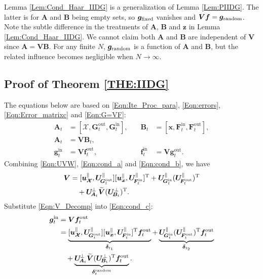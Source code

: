 \documentclass[journal]{IEEEtran}
\newcommand{\mr}{\mathrm}
\newcommand{\BS}{\begin{subequations}}
\newcommand{\ES}{\end{subequations}}
\renewcommand{\bf}{\bm}
\begin{document}
Lemma \ref{Lem:Cond_Haar_IIDG} is a generalization of Lemma \ref{Lem:PIIDG}. The latter is for $\bf{A}$ and $\bf{B}$ being empty sets, so $\bf{g}_{\rm fixed}$ vanishes and $\bf{Vf}=\bf{g}_{\rm random}$.  Note the subtle difference in the treatments of  $\bf{A}$, $\bf{B}$ and $\bf{z}$ in Lemma \ref{Lem:Cond_Haar_IIDG}. We cannot claim both $\bf{A}$ and $\bf{B}$ are independent of $\bf{V}$ since $\bf{A}=\bf{VB}$. For any finite $N$, $\bf{g}_{\rm random}$ is a function of $\bf{A}$ and $\bf{B}$, but the related influence becomes negligible when $N\to\infty$.   \vspace{-3mm}

\subsection{Proof of Theorem \ref{THE:IIDG}}\label{APP:IIDG_subsec}
The equations below are based on \eqref{Eqn:Ite_Proc_para}, \eqref{Eqn:errors}, \eqref{Eqn:Error_matrixc} and   \eqref{Eqn:G=VF}:\vspace{-0.4cm}
\BS\label{Eqn:conds}\begin{alignat}{2}
    \bf{A}_t &= \left[\bf{\mathcal{X}},  \bf{G}^{\mr{out}}_t, \bf{G}^{\mr{in}}_t\right],   &\quad \bf{B}_t& = \left[ \bf{x}, \bf{F}^{\mr{in}}_t, \bf{F}^{\mr{out}}_t\right],\label{Eqn:cond_a}\\
    \bf{A}_t &=\bf{VB}_t,&&\label{Eqn:cond_b}\\
    \bf{g}^{\mr{in}}_t &=\bf{V}\bf{f}^{\mr{out}}_t, &\quad \bf{f}^{\mr{in}}_t &=\bf{V}\bf{g}^{\mr{out}}_t.\label{Eqn:cond_c}
\end{alignat}\ES
Combining \eqref{Eqn:UVW}, \eqref{Eqn:cond_a} and \eqref{Eqn:cond_b}, we have
\begin{align} 
        \bf{V}  &= [\bf{u}^\parallel_{\bf{\mathcal{X}}}, \bf{U}_{\!\bf{G}_t^{\rm out}}^\parallel] [\bf{u}^\parallel_{\bf{x}}, \bf{U}_{\!\bf{F}_t^{\rm in}}^\parallel]^{\rm T} +\bf{U}_{\!\bf{G}_t^{\rm in}}^\parallel(\bf{U}_{\!\bf{F}_t^{\rm out}}^\parallel)^{\rm T} \nonumber\\
        & \quad+  \bf{U}^{\!\perp}_{\!\bf{A}_t}\widetilde{\bf{V}} (\bf{U}^\perp_{\!\bf{B}_t})^{\rm T}. \label{Eqn:V_Decomp}
\end{align} 
Substitute \eqref{Eqn:V_Decomp} into \eqref{Eqn:cond_c}:
\BS\label{Eqn:g_decom}\begin{align}
    \bf{g}^{\mr{in}}_t &=\bf{V}\bf{f}^{\mr{out}}_t\\
    &= \underbrace{[\bf{u}^\parallel_{\bf{\mathcal{X}}}, \bf{U}_{\!\bf{G}_t^{\rm out}}^\parallel] [\bf{u}^\parallel_{\bf{x}}, \bf{U}_{\!\bf{F}_t^{\rm in}}^\parallel]^{\rm T}\bf{f}^{\mr{out}}_t}_{\bf{\delta}_{t_1}} + \underbrace{\bf{U}_{\!\bf{G}_t^{\rm in}}^\parallel(\bf{U}_{\!\bf{F}_t^{\rm out}}^\parallel)^{\rm T}\bf{f}^{\mr{out}}_t}_{\bf{\delta}_{t_2}} \nonumber\\
    &\quad +  \underbrace{\bf{U}^{\!\perp}_{\!\bf{A}_t}\widetilde{\bf{V}} (\bf{U}^\perp_{\!\bf{B}_t})^{\rm T}\bf{f}^{\mr{out}}_t}_{\bf{\delta}_t^{\rm random}}.
\end{align}\ES
\end{document}
